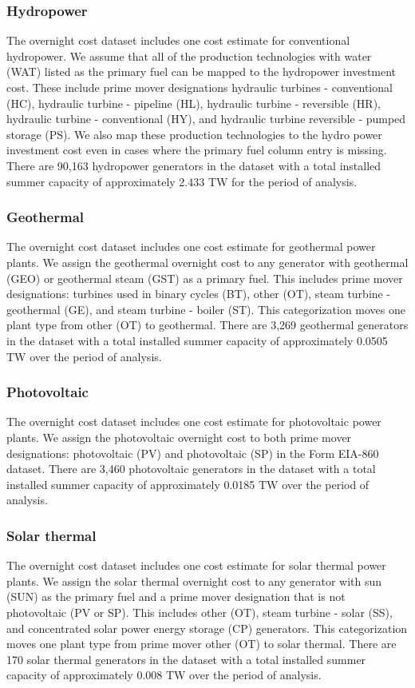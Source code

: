 \documentclass[10pt]{report}
\begin{document}
\subsubsection{Hydropower}
The overnight cost dataset includes one cost estimate for conventional hydropower.
We assume that all of the production technologies with water (WAT) listed as the primary fuel can be mapped to the hydropower investment cost.
These include prime mover designations hydraulic turbines - conventional (HC), hydraulic turbine - pipeline (HL), hydraulic turbine - reversible (HR), hydraulic turbine - conventional (HY), and hydraulic turbine reversible - pumped storage (PS). 
We also map these production technologies to the hydro power investment cost even in cases where the primary fuel column entry is missing. 
There are 90,163 hydropower generators in the dataset with a total installed summer capacity of approximately 2.433 TW for the period of analysis. 

\subsubsection{Geothermal}
The overnight cost dataset includes one cost estimate for geothermal power plants. 
We assign the geothermal overnight cost to any generator with geothermal (GEO) or geothermal steam (GST) as a primary fuel. 
This includes prime mover designations: turbines used in binary cycles (BT), other (OT), steam turbine - geothermal (GE), and steam turbine - boiler (ST).  
This categorization moves one plant type from other (OT) to geothermal. 
There are 3,269 geothermal generators in the dataset with a total installed summer capacity of approximately 0.0505 TW over the period of analysis. 

\subsubsection{Photovoltaic}
The overnight cost dataset includes one cost estimate for photovoltaic power plants.
We assign the photovoltaic overnight cost to both prime mover designations: photovoltaic (PV) and photovoltaic (SP) in the Form EIA-860 dataset.
There are 3,460 photovoltaic generators in the dataset with a total installed summer capacity of approximately 0.0185 TW over the period of analysis. 

\subsubsection{Solar thermal}
The overnight cost dataset includes one cost estimate for solar thermal power plants. 
We assign the solar thermal overnight cost to any generator with sun (SUN) as the primary fuel and a prime mover designation that is not photovoltaic (PV or SP).
This includes other (OT), steam turbine - solar (SS), and concentrated solar power energy storage (CP) generators.
This categorization moves one plant type from prime mover other (OT) to solar thermal.   
There are 170 solar thermal generators in the dataset with a total installed summer capacity of approximately 0.008 TW over the period of analysis.
\end{document}
